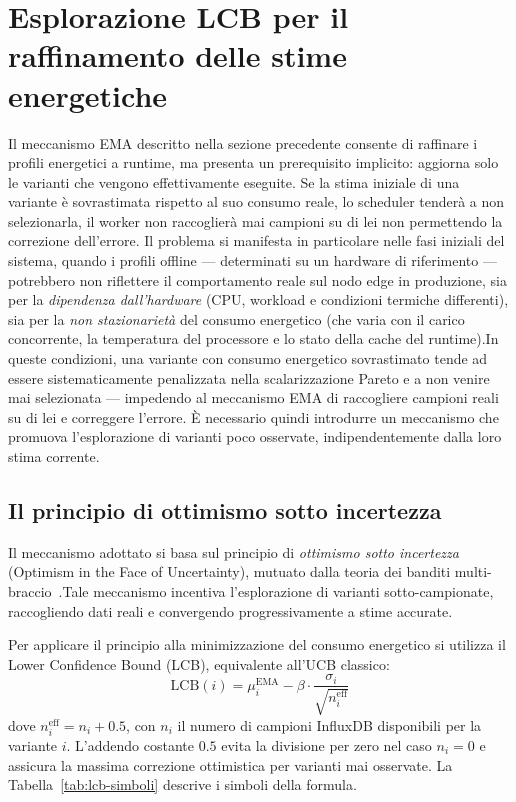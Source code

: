 \section{Esplorazione LCB per il raffinamento delle stime energetiche}
\label{sec:esplorazione-ucb}
 
Il meccanismo EMA descritto nella sezione precedente consente di
raffinare i profili energetici a runtime, ma presenta un prerequisito
implicito: aggiorna solo le varianti che vengono effettivamente
eseguite. Se la stima iniziale di una variante è sovrastimata rispetto
al suo consumo reale, lo scheduler tenderà a non selezionarla, il
worker non raccoglierà mai campioni su di lei non permettendo la correzione dell'errore. Il problema si 
manifesta in particolare
nelle fasi iniziali del sistema, quando i profili offline — determinati
su un hardware di riferimento — potrebbero non riflettere il
comportamento reale sul nodo edge in produzione, sia per la
\emph{dipendenza dall'hardware} (CPU, workload e condizioni termiche
differenti), sia per la \emph{non stazionarietà} del consumo energetico
(che varia con il carico concorrente, la temperatura del processore e
lo stato della cache del runtime).In queste condizioni, una variante con consumo energetico sovrastimato
tende ad essere sistematicamente penalizzata nella scalarizzazione
Pareto e a non venire mai selezionata — impedendo al meccanismo EMA
di raccogliere campioni reali su di lei e correggere l'errore. È
necessario quindi introdurre un meccanismo che promuova l'esplorazione
di varianti poco osservate, indipendentemente dalla loro stima corrente.
 
\subsection{Il principio di ottimismo sotto incertezza}
\label{subsec:ucb-principio}
 
Il meccanismo adottato si basa sul principio di \emph{ottimismo sotto
incertezza} (Optimism in the Face of Uncertainty), mutuato dalla teoria
dei banditi multi-braccio~\cite{auer2002finite}.Tale meccanismo incentiva
l'esplorazione di varianti sotto-campionate, raccogliendo dati reali e
convergendo progressivamente a stime accurate.
 
Per applicare il principio alla minimizzazione del consumo energetico si
utilizza il Lower Confidence Bound (LCB), equivalente all'UCB classico:
\begin{equation}
    \mathrm{LCB}(i) = \mu_i^\text{EMA}
        - \beta \cdot \frac{\sigma_i}{\sqrt{n_i^\text{eff}}}
    \label{eq:lcb}
\end{equation}
dove $n_i^\text{eff} = n_i + 0.5$, con $n_i$ il numero di campioni
InfluxDB disponibili per la variante $i$. L'addendo costante $0.5$
evita la divisione per zero nel caso $n_i = 0$ e assicura la massima
correzione ottimistica per varianti mai osservate. La
Tabella~\ref{tab:lcb-simboli} descrive i simboli della formula.
 
